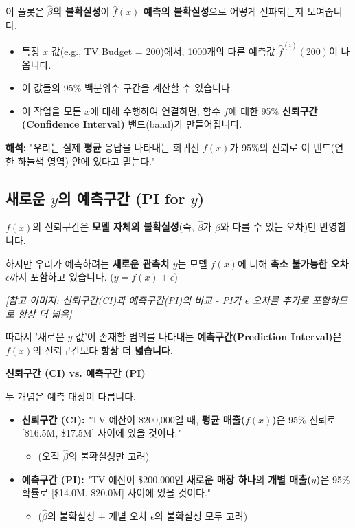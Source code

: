 \documentclass[11pt,a4paper]{book}
\theoremstyle{definition}
\begin{document}
이 플롯은 \textbf{$\hat{\beta}$의 불확실성}이 \textbf{$\hat{f}(x)$ 예측의 불확실성}으로 어떻게 전파되는지 보여줍니다.

\begin{itemize}
    \item 특정 $x$ 값(e.g., TV Budget = 200)에서, 1000개의 다른 예측값 $\hat{f}^{(i)}(200)$이 나옵니다.
    \item 이 값들의 95\% 백분위수 구간을 계산할 수 있습니다.
    \item 이 작업을 모든 $x$에 대해 수행하여 연결하면, 함수 $f$에 대한 95\% \textbf{신뢰구간(Confidence Interval)} 밴드(band)가 만들어집니다.
\end{itemize}

\textbf{해석:} "우리는 실제 \textbf{평균} 응답을 나타내는 회귀선 $f(x)$가 95\%의 신뢰로 이 밴드(연한 하늘색 영역) 안에 있다고 믿는다."

\subsection{새로운 $y$의 예측구간 (PI for $y$)}

$f(x)$의 신뢰구간은 \textbf{모델 자체의 불확실성}(즉, $\hat{\beta}$가 $\beta$와 다를 수 있는 오차)만 반영합니다.

하지만 우리가 예측하려는 \textbf{새로운 관측치 $y$}는 모델 $f(x)$에 더해 \textbf{축소 불가능한 오차 $\epsilon$}까지 포함하고 있습니다. ($y = f(x) + \epsilon$)

\textit{[참고 이미지: 신뢰구간(CI)과 예측구간(PI)의 비교 - PI가 $\epsilon$ 오차를 추가로 포함하므로 항상 더 넓음]}

따라서 '새로운 $y$ 값'이 존재할 범위를 나타내는 \textbf{예측구간(Prediction Interval)}은 $f(x)$의 신뢰구간보다 \textbf{항상 더 넓습니다.}

\begin{warningbox}
\textbf{신뢰구간 (CI) vs. 예측구간 (PI)}

두 개념은 예측 대상이 다릅니다.

\begin{itemize}
    \item \textbf{신뢰구간 (CI):} "TV 예산이 \$200,000일 때, \textbf{평균 매출($f(x)$)}은 95\% 신뢰로 [\$16.5M, \$17.5M] 사이에 있을 것이다."
        \begin{itemize}
            \item (오직 $\hat{\beta}$의 불확실성만 고려)
        \end{itemize}
    \item \textbf{예측구간 (PI):} "TV 예산이 \$200,000인 \textbf{새로운 매장 하나}의 \textbf{개별 매출($y$)}은 95\% 확률로 [\$14.0M, \$20.0M] 사이에 있을 것이다."
        \begin{itemize}
            \item ($\hat{\beta}$의 불확실성 + 개별 오차 $\epsilon$의 불확실성 모두 고려)
        \end{itemize}
\end{itemize}
\end{warningbox}
\end{document}
